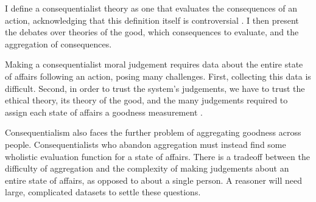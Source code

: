 \begin{isabellebody}
\begin{isamarkuptext}
\end{isamarkuptext}\isamarkuptrue%
%
\isadelimdocument
%
\endisadelimdocument
%
\isatagdocument
%
\isamarkuptrue%
%
\isamarkuptrue%
%
\endisatagdocument
{\isafolddocument}%
%
\isadelimdocument
%
\endisadelimdocument
%
\begin{isamarkuptext}%
I define
a consequentialist theory as one that evaluates the consequences of an action, acknowledging that
this definition itself is controversial \cite{consequentialismsep}. I then present the debates over theories of the good, which 
consequences to evaluate, and the aggregation of consequences.%
\end{isamarkuptext}\isamarkuptrue%
%
\isadelimdocument
%
\endisadelimdocument
%
\isatagdocument
%
\isamarkuptrue%
%
\isamarkuptrue%
%
\endisatagdocument
{\isafolddocument}%
%
\isadelimdocument
%
\endisadelimdocument
%
\begin{isamarkuptext}%
Making a consequentialist moral judgement requires data about the entire state of affairs following
an action, posing many challenges. First, collecting this data is difficult. Second, in order to trust 
the system's judgements, we have to trust the ethical theory, its theory of the good, and the many
judgements required to assign each state of affairs a goodness measurement \cite{utilsep}.%
\end{isamarkuptext}\isamarkuptrue%
%
\isadelimdocument
%
\endisadelimdocument
%
\isatagdocument
%
\isamarkuptrue%
%
\endisatagdocument
{\isafolddocument}%
%
\isadelimdocument
%
\endisadelimdocument
%
\begin{isamarkuptext}%
Consequentialism also faces the further problem of aggregating goodness across people. 
Consequentialists who abandon aggregation must instead find some wholistic evaluation function
for a state of affairs. There is a tradeoff between the difficulty of aggregation
and the complexity of making judgements about an entire state of affairs, as opposed to about a single person.
A reasoner will need large, complicated datasets to settle these questions.%
\end{isamarkuptext}\isamarkuptrue%
%
\isadelimdocument
%
\endisadelimdocument
%
\isatagdocument
%
\isamarkuptrue%
%
\end{isabellebody}
